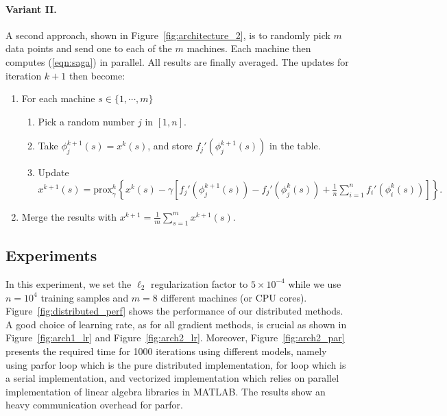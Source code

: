 \documentclass[a4paper,11pt]{article}
\newcommand{\eqnref}[1]{(\ref{eqn:#1})}
\newcommand{\figref}[1]{Figure~\ref{fig:#1}}
\newcommand{\prox}{\textrm{prox}}
\begin{document}
\paragraph{Variant II.} A second approach, shown in \figref{architecture_2},
is to randomly pick $m$ data points and send one to each of the $m$ machines.
Each machine then computes \eqnref{saga} in parallel. All results are finally
averaged. The updates for iteration $k+1$ then become:
\begin{enumerate}	
	\item For each machine $s \in \{ 1, \cdots, m \}$
	\begin{enumerate}
		\item Pick a random number $j$ in $[1, n]$.
		\item Take $\phi_j^{k+1}(s) = x^k(s)$, and store $f_j'(\phi_j^{k+1}(s))$
			in the table.
		\item Update $x^{k+1}(s) = \prox_\gamma^h \left\{
			x^k(s) - \gamma \left[ f_j'(\phi_j^{k+1}(s)) - f_j'(\phi_j^k(s))
			+ \frac1n \sum_{i=1}^n f_i'(\phi_i^k(s)) \right] \right\}.$
	\end{enumerate}
	\item Merge the results with $ x^{k+1} = \frac{1}{m} \sum_{s=1}^m
		x^{k+1}(s)$.
\end{enumerate}

\subsection{Experiments}

In this experiment, we set the $\ell_2$ regularization factor to $5\times
10^{-4}$ while we use $n=10^4$ training samples and $m=8$ different machines (or
CPU cores). \figref{distributed_perf} shows the performance of our distributed
methods. A good choice of learning rate, as for all gradient methods, is crucial
as shown in \figref{arch1_lr} and \figref{arch2_lr}. Moreover,
\figref{arch2_par} presents the required time for 1000 iterations using
different models, namely using parfor loop which is the pure distributed
implementation, for loop which is a serial implementation, and vectorized
implementation which relies on parallel implementation of linear algebra
libraries in MATLAB. The results show an heavy communication overhead for
parfor.
\end{document}
